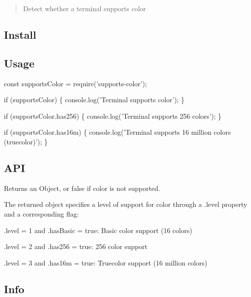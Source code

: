 \begin{quote}
Detect whether a terminal supports color \end{quote}


\subsection*{Install}




\subsection*{Usage}


\begin{DoxyCode}
const supportsColor = require('supports-color');

if (supportsColor) \{
    console.log('Terminal supports color');
\}

if (supportsColor.has256) \{
    console.log('Terminal supports 256 colors');
\}

if (supportsColor.has16m) \{
    console.log('Terminal supports 16 million colors (truecolor)');
\}
\end{DoxyCode}


\subsection*{A\+PI}

Returns an {\ttfamily Object}, or {\ttfamily false} if color is not supported.

The returned object specifies a level of support for color through a {\ttfamily .level} property and a corresponding flag\+:


\begin{DoxyItemize}
\item {\ttfamily .level = 1} and {\ttfamily .has\+Basic = true}\+: Basic color support (16 colors)
\item {\ttfamily .level = 2} and {\ttfamily .has256 = true}\+: 256 color support
\item {\ttfamily .level = 3} and {\ttfamily .has16m = true}\+: Truecolor support (16 million colors)
\end{DoxyItemize}

\subsection*{Info}

